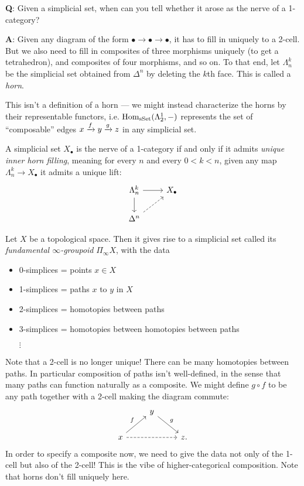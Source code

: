 \documentclass[11pt]{amsart}
\begin{document}
\textbf{Q}: Given a simplicial set, when can you tell whether it arose as the nerve of a 1-category?

\textbf{A}: Given any diagram of the form $\bullet \to \bullet \to \bullet$, it has to fill in uniquely to a 2-cell. But we also need to fill in composites of three morphisms uniquely (to get a tetrahedron), and composites of four morphisms, and so on. To that end, let $\Lambda^k_n$ be the simplicial set obtained from $\Delta^n$ by deleting the $k$th face. This is called a \textit{horn}.

This isn't a definition of a horn --- we might instead characterize the horns by their representable functors, i.e. $\mathrm{Hom}_{\mathrm{sSet}}(\Lambda_2^1,-)$ represents the set of ``composable'' edges $x \xrightarrow{f} y \xrightarrow{g} z$ in any simplicial set.

\begin{proposition} A simplicial set $X_\bullet$ is the nerve of a 1-category if and only if it admits \textit{unique inner horn filling}, meaning for every $n$ and every $0 < k < n$, given any map $\Lambda^k_n \to X_\bullet$ it admits a unique lift:
\[ \begin{tikzcd}
    \Lambda^k_n\rar\dar & X_\bullet\\
    \Delta^n\ar[ur,dashed] & 
\end{tikzcd} \]
\end{proposition}



\begin{example} Let $X$ be a topological space. Then it gives rise to a simplicial set called its \textit{fundamental $\infty$-groupoid} $\Pi_{\infty} X$, with the data
\begin{itemize}
    \item 0-simplices = points $x \in X$
    \item 1-simplices = paths $x$ to $y$ in $X$
    \item 2-simplices = homotopies between paths
    \item 3-simplices = homotopies between homotopies between paths
    \item[$\vdots$]
\end{itemize}
Note that a 2-cell is no longer unique! There can be many homotopies between paths. In particular composition of paths isn't well-defined, in the sense that many paths can function naturally as a composite. We might define $g\circ f$ to be any path together with a 2-cell making the diagram commute:
\[ \begin{tikzcd}
     & y\ar[dr,"g" above right]\\
    x\ar[ur,"f" above left]\ar[rr,dashed] &  & z.
\end{tikzcd} \]
In order to specify a composite now, we need to give the data not only of the 1-cell but also of the 2-cell! This is the vibe of higher-categorical composition. Note that horns don't fill uniquely here.
\end{example}
\end{document}
